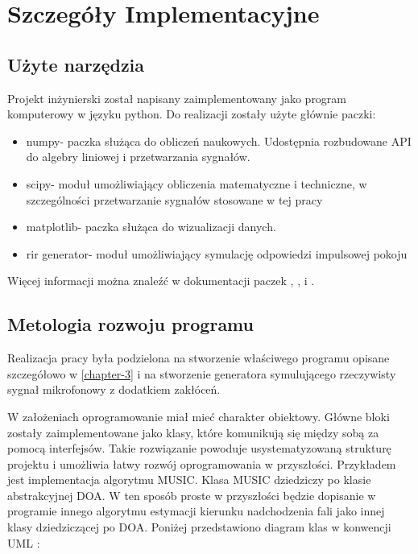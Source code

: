 \chapter{Szczegóły Implementacyjne}
\label{chapter-4}

\section{Użyte narzędzia}

\noindent Projekt inżynierski został napisany zaimplementowany jako program komputerowy w języku python. Do realizacji zostały użyte głównie paczki:

\begin{itemize}
    \item numpy- paczka służąca do obliczeń naukowych. Udostępnia rozbudowane API do algebry liniowej i przetwarzania sygnałów.
    \item scipy- moduł umożliwiający obliczenia matematyczne i techniczne, w szczególności przetwarzanie sygnałów stosowane w tej pracy
    \item matplotlib- paczka służąca do wizualizacji danych.
    \item rir generator- moduł umożliwiający symulację odpowiedzi impulsowej pokoju
\end{itemize}

\noindent Więcej informacji można znaleźć w dokumentacji paczek \cite{numpy}, \cite{matplotlib}, \cite{rir} i \cite{scipy}.

\section{Metologia rozwoju programu}

\noindent Realizacja pracy była podzielona na stworzenie właściwego programu opisane szczegółowo w \ref{chapter-3} i na stworzenie generatora symulującego rzeczywisty sygnał mikrofonowy z dodatkiem zakłóceń.


W założeniach oprogramowanie miał mieć charakter obiektowy. Główne bloki zostały zaimplementowane jako klasy, które komunikują się między sobą za pomocą interfejsów. Takie rozwiązanie powoduje usystematyzowaną strukturę projektu i umożliwia łatwy rozwój oprogramowania w przyszłości. Przykładem jest implementacja algorytmu MUSIC. Klasa MUSIC dziedziczy po klasie abstrakcyjnej DOA. W ten sposób proste w przyszłości będzie dopisanie w programie innego algorytmu estymacji kierunku nadchodzenia fali jako innej klasy dziedziczącej po DOA. Poniżej przedstawiono diagram klas w konwencji UML \cite{uml}:

